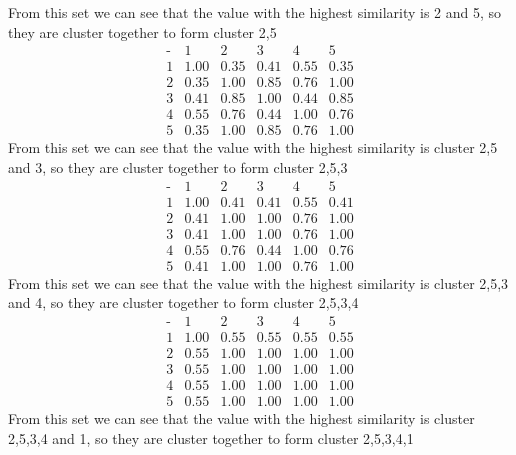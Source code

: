 \documentclass[12pt,english]{article}
\begin{document}
From this set we can see that the value with the highest similarity is 2 and 5, so they are cluster together to form cluster 2,5\\
\begin{equation*}
\begin{array}{c|ccccc}
\mbox{-}& 1 & 2 & 3 & 4 & 5\\
\hline
1 & 1.00 & 0.35 & 0.41 & 0.55 & 0.35 \\
2 & 0.35 & 1.00 & 0.85 & 0.76 & 1.00 \\
3 & 0.41 & 0.85 & 1.00 & 0.44 & 0.85 \\
4 & 0.55 & 0.76 & 0.44 & 1.00 & 0.76 \\
5 & 0.35 & 1.00 & 0.85 & 0.76 & 1.00 
\end{array}
\end{equation*}
From this set we can see that the value with the highest similarity is cluster 2,5 and 3, so they are cluster together to form cluster 2,5,3\\
\begin{equation*}
\begin{array}{c|ccccc}
\mbox{-}& 1 & 2 & 3 & 4 & 5\\
\hline
1 & 1.00 & 0.41 & 0.41 & 0.55 & 0.41 \\
2 & 0.41 & 1.00 & 1.00 & 0.76 & 1.00 \\
3 & 0.41 & 1.00 & 1.00 & 0.76 & 1.00 \\
4 & 0.55 & 0.76 & 0.44 & 1.00 & 0.76 \\
5 & 0.41 & 1.00 & 1.00 & 0.76 & 1.00 
\end{array}
\end{equation*}
From this set we can see that the value with the highest similarity is cluster 2,5,3 and 4, so they are cluster together to form cluster 2,5,3,4\\
\begin{equation*}
\begin{array}{c|ccccc}
\mbox{-}& 1 & 2 & 3 & 4 & 5\\
\hline
1 & 1.00 & 0.55 & 0.55 & 0.55 & 0.55 \\
2 & 0.55 & 1.00 & 1.00 & 1.00 & 1.00 \\
3 & 0.55 & 1.00 & 1.00 & 1.00 & 1.00 \\
4 & 0.55 & 1.00 & 1.00 & 1.00 & 1.00 \\
5 & 0.55 & 1.00 & 1.00 & 1.00 & 1.00 
\end{array}
\end{equation*}
From this set we can see that the value with the highest similarity is cluster 2,5,3,4 and 1, so they are cluster together to form cluster 2,5,3,4,1\\
\end{document}
